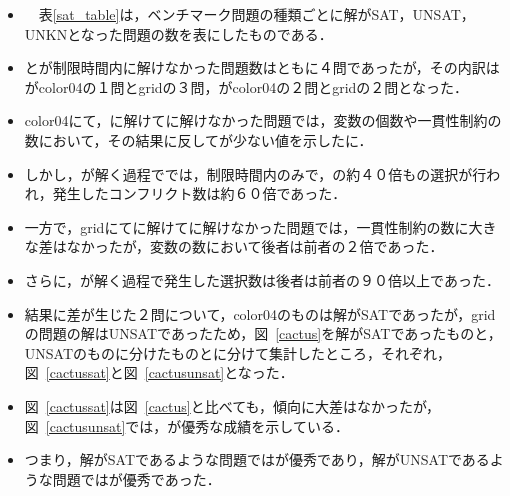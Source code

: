 \begin{itemize}
\item　表\ref{sat_table}は，ベンチマーク問題の種類ごとに解がSAT，UNSAT，UNKNとなった問題の数を表にしたものである．
\item {}とが制限時間内に解けなかった問題数はともに４問であったが，その内訳はがcolor04の１問とgridの３問，がcolor04の２問とgridの２問となった．
\item color04にて，に解けてに解けなかった問題では，変数の個数や一貫性制約の数において，その結果に反してが少ない値を示したに．
\item しかし，{\clingo}が解く過程ででは，制限時間内のみで，の約４０倍もの選択が行われ，発生したコンフリクト数は約６０倍であった．
\item 一方で，gridにてに解けてに解けなかった問題では，一貫性制約の数に大きな差はなかったが，変数の数において後者は前者の２倍であった．
\item さらに，{\clingo}が解く過程で発生した選択数は後者は前者の９０倍以上であった．
\item 結果に差が生じた２問について，color04のものは解がSATであったが，gridの問題の解はUNSATであったため，図~\ref{cactus}を解がSATであったものと，UNSATのものに分けたものとに分けて集計したところ，それぞれ，図~\ref{cactussat}と図~\ref{cactusunsat}となった．
\item 図~\ref{cactussat}は図~\ref{cactus}と比べても，傾向に大差はなかったが，図~\ref{cactusunsat}では，が優秀な成績を示している．
\item つまり，解がSATであるような問題ではが優秀であり，解がUNSATであるような問題ではが優秀であった．
\end{itemize}

